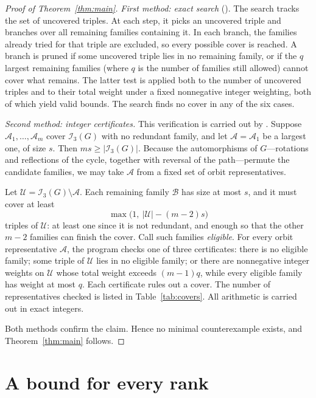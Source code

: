 \documentclass[11pt]{amsart}
\theoremstyle{definition}
\theoremstyle{remark}
\numberwithin{equation}{section}
\begin{document}
\begin{proof}[Proof of Theorem~\ref{thm:main}]
\emph{First method: exact search} ().
The search tracks the set of uncovered triples. At each step, it picks an
uncovered triple and branches over all remaining families containing it. In
each branch, the families already tried for that triple are excluded, so every
possible cover is reached. A branch is pruned if some uncovered triple lies in
no remaining family, or if the $q$ largest remaining families (where $q$ is the
number of families still allowed) cannot cover what remains. The latter test is
applied both to the number of uncovered triples and to their total weight under
a fixed nonnegative integer weighting, both of which yield valid bounds. The
search finds no cover in any of the six cases.

\emph{Second method: integer certificates.} This verification is carried out by
. Suppose $\mathcal A_1,\dots,\mathcal A_m$
cover $\mathcal I_3(G)$ with no redundant family, and let $\mathcal A=\mathcal A_1$
be a largest one, of size $s$. Then $ms\ge|\mathcal I_3(G)|$. Because the
automorphisms of $G$---rotations and reflections of the cycle, together with
reversal of the path---permute the candidate families, we may take $\mathcal A$
from a fixed set of orbit representatives.

Let $\mathcal U=\mathcal I_3(G)\setminus\mathcal A$. Each remaining family
$\mathcal B$ has size at most $s$, and it must cover at least
\[
\max\bigl(1,\ |\mathcal U|-(m-2)s\bigr)
\]
triples of $\mathcal U$: at least one since it is not redundant, and enough so
that the other $m-2$ families can finish the cover. Call such families
\emph{eligible}. For every orbit representative $\mathcal A$, the program
checks one of three certificates: there is no eligible family; some triple of
$\mathcal U$ lies in no eligible family; or there are nonnegative integer
weights on $\mathcal U$ whose total weight exceeds $(m-1)q$, while every
eligible family has weight at most $q$. Each certificate rules out a cover. The
number of representatives checked is listed in Table~\ref{tab:covers}. All
arithmetic is carried out in exact integers.

Both methods confirm the claim. Hence no minimal counterexample exists, and
Theorem~\ref{thm:main} follows.
\end{proof}

\section{A bound for every rank}\label{sec:allk}
\end{document}
